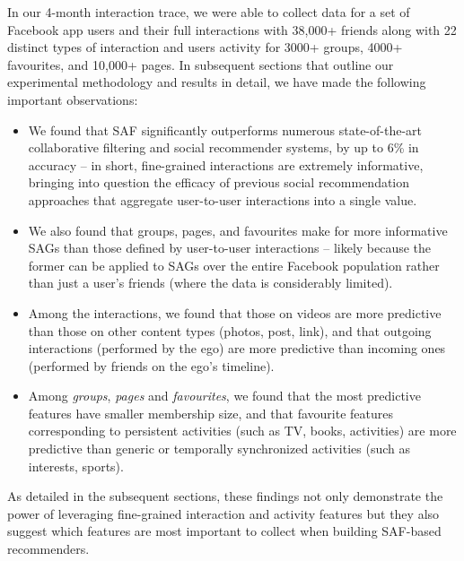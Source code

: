 In our 4-month interaction trace, we were able to collect data for a set of 
Facebook app users and their full interactions with 38,000+ friends along with 22
distinct types of interaction and users activity for 3000+ groups, 4000+ favourites, and 10,000+ pages. 
In subsequent sections that outline our experimental methodology and results in detail, 
we have made the following important observations:
\begin{itemize}
\item We found that SAF significantly 
outperforms numerous state-of-the-art collaborative filtering and social recommender 
systems, by up to 6\% in accuracy -- in short, fine-grained 
interactions are extremely informative, bringing into question the efficacy of 
previous social recommendation approaches that aggregate user-to-user interactions into 
a single value.
\item We also found that groups, pages, and favourites make for more informative
SAGs than those defined by user-to-user interactions -- likely because the former can be
applied to SAGs over the entire Facebook population 
rather than just a user's friends (where the data is considerably limited).
\item Among the interactions, we found that those on videos are more predictive than those on other content types (photos, post, link), and that outgoing interactions (performed by the ego) 
are more predictive than incoming ones (performed by friends on the ego's timeline).
\item Among {\em groups}, {\em pages} and {\em favourites}, we found that the most  
predictive features have smaller membership size, and that favourite features corresponding to 
persistent activities (such as TV, books, activities) are more predictive than generic or 
temporally synchronized activities (such as interests, sports). 
\end{itemize}
As detailed in the subsequent sections, these findings 
not only demonstrate the power of leveraging fine-grained
interaction and activity features but they also suggest which features are most
important to collect when building SAF-based recommenders.



\yum

